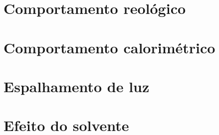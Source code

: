 		\section{Comportamento reológico}
		\section{Comportamento calorimétrico}
		
		\section{Espalhamento de luz}
		\section{Efeito do solvente}
		\label{sec:efeito_solvente}
		
